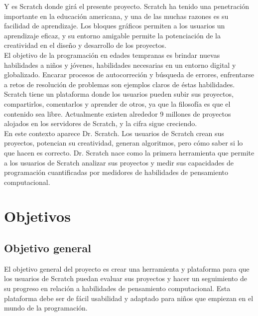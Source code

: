 \documentclass[a4paper, 12pt]{book}
\begin{document}
Y es Scratch donde girá el presente proyecto. Scratch ha tenido una penetración importante 
en la educación americana, y una de las muchas razones es su facilidad de aprendizaje. Los
bloques gráficos permiten a los usuarios un aprendizaje eficaz, y su entorno amigable permite 
la potenciación de la creatividad en el diseño y desarrollo de los proyectos. \\

El objetivo de la programación en edades tempranas es brindar nuevas habilidades a niños y
jóvenes, habilidades necesarias en un entorno digital y globalizado. Encarar procesos de
autocorreción y búsqueda de errores, enfrentarse a retos de resolución de problemas son ejemplos
claros de éstas habilidades. \\

Scratch tiene un plataforma donde los usuarios pueden subir sus proyectos, compartirlos, 
comentarlos y aprender de otros, ya que la filosofía es que el contenido sea libre. Actualmente
existen alrededor 9 millones de proyectos alojados en los servidores de Scratch, y la cifra
sigue creciendo. \\

En este contexto aparece Dr. Scratch. Los usuarios de Scratch crean sus proyectos, potencian
su creatividad, generan algoritmos, pero cómo saber si lo que hacen es correcto. Dr. Scratch
nace como la primera herramienta que permite a los usuarios de Scratch analizar sus proyectos
y medir sus capacidades de programación cuantificadas por medidores de habilidades de 
pensamiento computacional. 









\cleardoublepage
\chapter{Objetivos}
\label{chap:objetivos}

\section{Objetivo general}
\label{sec:objetivo-general}

El objetivo general del proyecto es crear una herramienta y plataforma para que los
usuarios de Scratch puedan evaluar sus proyectos y hacer un seguimiento de su progreso
en relación a habilidades de pensamiento computacional. Esta plataforma debe ser
de fácil usabilidad y adaptado para niños que empiezan en el mundo de la 
programación.
\end{document}
